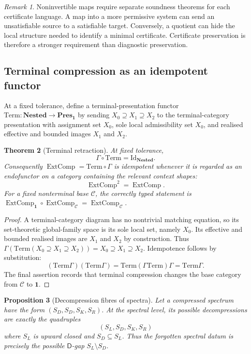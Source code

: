 \documentclass[11pt]{article}
\theoremstyle{plain}
\newtheorem{theorem}{Theorem}[section]
\newtheorem{proposition}[theorem]{Proposition}
\theoremstyle{definition}
\theoremstyle{remark}
\newtheorem{remark}[theorem]{Remark}
\begin{document}
\begin{remark}
Noninvertible maps require separate soundness theorems for each certificate
language. A map into a more permissive system can send an unsatisfiable source to
a satisfiable target. Conversely, a quotient can hide the local structure needed
to identify a minimal certificate. Certificate preservation is therefore a
stronger requirement than diagnostic preservation.
\end{remark}

\subsection{Terminal compression as an idempotent functor}

At a fixed tolerance, define a terminal-presentation functor
$\mathrm{Term}:\mathbf{Nested}\to\mathbf{Pres}_{\mathbf 1}$ by sending
$X_0\supseteq X_1\supseteq X_2$ to the terminal-category presentation with
assignment set $X_0$, sole local admissibility set $X_0$, and realised effective
and bounded images $X_1$ and $X_2$.

\begin{theorem}[Terminal retraction]
\label{thm:terminal-retraction-monograph}
At fixed tolerance,
\[
\Gamma\circ\mathrm{Term}=\mathrm{Id}_{\mathbf{Nested}}.
\]
Consequently $\operatorname{ExtComp}=\mathrm{Term}\circ\Gamma$ is idempotent
whenever it is regarded as an endofunctor on a category containing the relevant
context shapes:
\[
\operatorname{ExtComp}^2=\operatorname{ExtComp}.
\]
For a fixed nonterminal base $\mathcal C$, the correctly typed statement is
$\operatorname{ExtComp}_{\mathbf 1}\circ\operatorname{ExtComp}_{\mathcal C}
=\operatorname{ExtComp}_{\mathcal C}$.
\end{theorem}

\begin{proof}
A terminal-category diagram has no nontrivial matching equation, so its
set-theoretic global-family space is its sole local set, namely $X_0$. Its
effective and bounded realised images are $X_1$ and $X_2$ by construction. Thus
$\Gamma(\mathrm{Term}(X_0\supseteq X_1\supseteq X_2))=X_0\supseteq X_1\supseteq
X_2$. Idempotence follows by substitution:
\[
(\mathrm{Term}\Gamma)(\mathrm{Term}\Gamma)
=\mathrm{Term}(\Gamma\mathrm{Term})\Gamma
=\mathrm{Term}\Gamma.
\]
The final assertion records that terminal compression changes the base category
from $\mathcal C$ to $\mathbf 1$.
\end{proof}

\begin{proposition}[Decompression fibres of spectra]
\label{prop:decompression-fibres-monograph}
Let a compressed spectrum have the form
$(S_D,S_D,S_K,S_R)$. At the spectral level, its possible decompressions are
exactly the quadruples
\[
(S_L,S_D,S_K,S_R)
\]
where $S_L$ is upward closed and $S_D\subseteq S_L$. Thus the forgotten spectral
datum is precisely the possible $\mathsf D$-gap $S_L\setminus S_D$.
\end{proposition}
\end{document}
